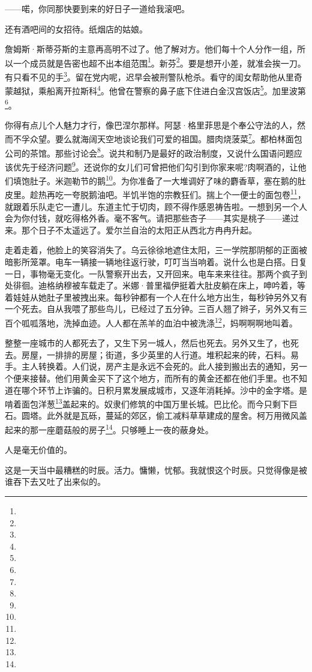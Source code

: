 \par ——喏，你同那快要到来的好日子一道给我滚吧。
\par 还有酒吧间的女招待。纸烟店的姑娘。
\par 詹姆斯·斯蒂芬斯的主意再高明不过了。他了解对方。他们每十个人分作一组，所以一个成员就是告密也超不出本组范围\footnote{}。新芬\footnote{}。要是想开小差，就准会挨一刀。有只看不见的手\footnote{}。留在党内呢，迟早会被刑警队枪杀。看守的闺女帮助他从里奇蒙越狱，乘船离开拉斯科\footnote{}。他曾在警察的鼻子底下住进白金汉宫饭店\footnote{}。加里波第\footnote{}。
\par 你得有点儿个人魅力才行，像巴涅尔那样。阿瑟·格里菲思是个奉公守法的人，然而不孚众望。要么就海阔天空地谈论我们可爱的祖国。腊肉烧菠菜\footnote{}。都柏林面包公司的茶馆。那些讨论会\footnote{}。说共和制乃是最好的政治制度，又说什么国语问题应该优先于经济问题\footnote{}。还说你的女儿们可曾把他们勾引到你家来呢?肉啊酒的，让他们填饱肚子。米迦勒节的鹅\footnote{}。为你准备了一大堆调好了味的麝香草，塞在鹅的肚皮里。趁热再吃一夸脱鹅油吧。半饥半饱的宗教狂们。揣上个一便士的面包卷\footnote{}，就跟着乐队走它一遭儿。东道主忙于切肉，顾不得作感恩祷告啦。一想到另一个人会为你付钱，就吃得格外香。毫不客气。请把那些杏子——其实是桃子——递过来。那个日子不太遥远了。爱尔兰自治的太阳正从西北方冉冉升起。
\par 走着走着，他脸上的笑容消失了。乌云徐徐地遮住太阳，三一学院那阴郁的正面被暗影所笼罩。电车一辆接一辆地往返行驶，叮叮当当响着。说什么也是白搭。日复一日，事物毫无变化。一队警察开出去，又开回来。电车来来往往。那两个疯子到处徘徊。迪格纳穆被车载走了。米娜·普里福伊挺着大肚皮躺在床上，呻吟着，等着娃娃从她肚子里被拽出来。每秒钟都有一个人在什么地方出生，每秒钟另外又有一个死去。自从我喂了那些鸟儿，已经过了五分钟。三百人翘了辫子，另外又有三百个呱呱落地，洗掉血迹。人人都在羔羊的血泊中被洗涤\footnote{}，妈啊啊啊地叫着。
\par 整整一座城市的人都死去了，又生下另一城人，然后也死去。另外又生了，也死去。房屋，一排排的房屋；街道，多少英里的人行道。堆积起来的砖，石料。易手。主人转换着。人们说，房产主是永远不会死的。此人接到搬出去的通知，另一个便来接替。他们用黄金买下了这个地方，而所有的黄金还都在他们手里。也不知道在哪个环节上诈骗的。日积月累发展成城市，又逐年消耗掉。沙中的金字塔。是啃着面包洋葱\footnote{}盖起来的。奴隶们修筑的中国万里长城。巴比伦。而今只剩下巨石。圆塔。此外就是瓦砾，蔓延的郊区，偷工减料草草建成的屋舍。柯万用微风盖起来的那一座蘑菇般的房子\footnote{}。只够睡上一夜的蔽身处。
\par 人是毫无价值的。
\par 这是一天当中最糟糕的时辰。活力。慵懒，忧郁。我就恨这个时辰。只觉得像是被谁吞下去又吐了出来似的。
